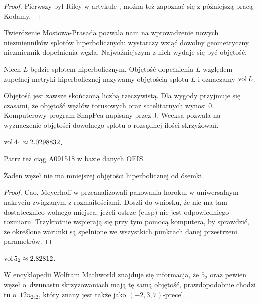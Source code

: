 \begin{proof}
    Pierwszy był Riley w artykule \cite{riley75}, można też zapoznać się z późniejszą pracą \cite{kodama92} Kodamy.
\end{proof}


Twierdzenie Mostowa-Prasada pozwala nam na wprowadzenie nowych niezmienników splotów hiperbolicznych: wystarczy wziąć dowolny geometryczny niezmiennik dopełnienia węzła.
Najważniejszym z nich wydaje się być objętość.

\begin{definition}[objętość]
    Niech $L$ będzie splotem hiperbolicznym.
    Objętość dopełnienia $L$ względem zupełnej metryki hiperbolicznej nazywamy objętością splotu $L$ i oznaczamy $\operatorname{vol} L$.
\end{definition}

Objętość jest zawsze skończoną liczbą rzeczywistą.
Dla wygody przyjmuje się czasami, że objętość węzłów torusowych oraz satelitarnych wynosi $0$.
Komputerowy program SnapPea napisany przez J. Weeksa pozwala na wyznaczenie objętości dowolnego splotu o rozsądnej ilości skrzyżowań.

\begin{example}
    $\operatorname{vol} 4_1 \approx 2.0298832$.
\end{example}

Patrz też ciąg A091518 w bazie danych OEIS.

\begin{proposition}
    \label{least_volume}
    Żaden węzeł nie ma mniejszej objętości hiperbolicznej od ósemki.
\end{proposition}

\begin{proof}
    Cao, Meyerhoff w \cite{cao01} przeanalizowali pakowania horokul w uniwersalnym nakryciu związanym z rozmaitościami.
    Doszli do wniosku, że nie ma tam dostatecznieo wolnego miejsca, jeżeli ostrze (cusp) nie jest odpowiedniego rozmiaru.
    Trzykrotnie wspierają się przy tym pomocą komputera, by sprawdzić, że określone warunki są spełnione we wszystkich punktach danej przestrzeni parametrów.
\end{proof}

\begin{example}
    $\operatorname{vol} 5_2 \approx 2.82812$.
\end{example}

W encyklopedii Wolfram Mathworld znajduje się informacja, że $5_2$ oraz pewien węzeł o~dwunastu skrzyżowaniach mają tę samą objętość, prawdopodobnie chodzi tu o~$12n_{242}$, który znany jest także jako $(-2, 3, 7)$-precel. 

